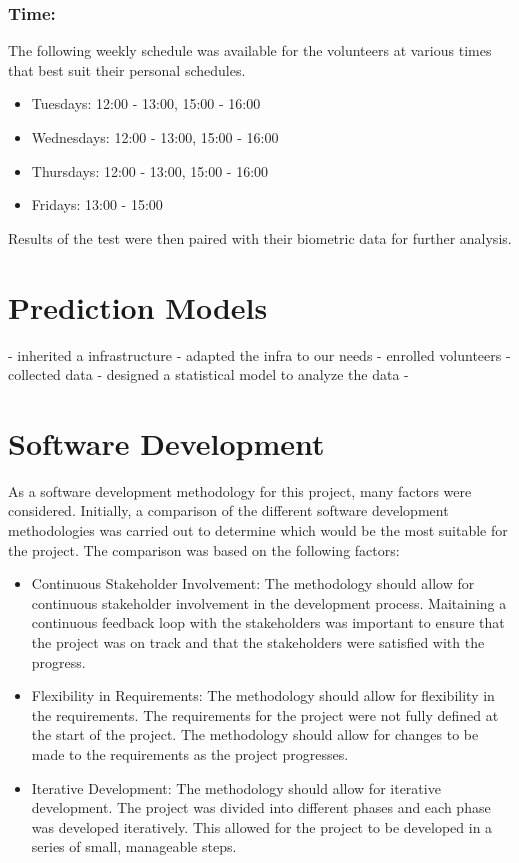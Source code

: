 \subsubsection*{Time:}

The following weekly schedule was available for the volunteers at various times that best suit their personal schedules.
\begin{itemize}
    \item Tuesdays: 12:00 - 13:00, 15:00 - 16:00
    \item Wednesdays: 12:00 - 13:00, 15:00 - 16:00
    \item Thursdays: 12:00 - 13:00, 15:00 - 16:00
    \item Fridays: 13:00 - 15:00
\end{itemize}

Results of the test were then paired with their biometric data for further analysis.

\section{Prediction Models}
- inherited a infrastructure
- adapted the infra to our needs
- enrolled volunteers
- collected data
- designed a statistical model to analyze the data
- 

\section{Software Development}
As a software development methodology for this project, many factors were considered. Initially, a comparison of the different software development methodologies was carried out to determine
which would be the most suitable for the project. The comparison was based on the following factors:

\begin{itemize}
    \item Continuous Stakeholder Involvement: The methodology should allow for continuous stakeholder involvement in the development process. Maitaining a continuous feedback loop with the stakeholders was important to ensure that the project was on track and that the stakeholders were satisfied with the progress.
    \item Flexibility in Requirements: The methodology should allow for flexibility in the requirements. The requirements for the project were not fully defined at the start of the project. The methodology should allow for changes to be made to the requirements as the project progresses.
    \item Iterative Development: The methodology should allow for iterative development. The project was divided into different phases and each phase was developed iteratively. This allowed for the project to be developed in a series of small, manageable steps.    
\end{itemize}

